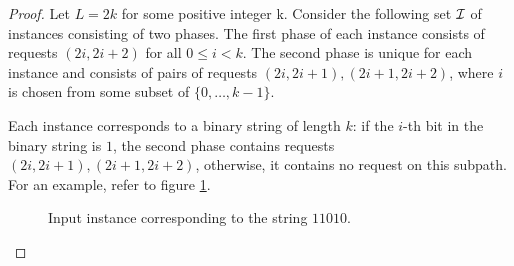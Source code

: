 \begin{proof}
    Let $L = 2k$ for some positive integer k. Consider the following set
    $\mathcal{I}$ of instances consisting of two phases. The first phase of each
    instance consists of requests $(2i, 2i+2)$ for all $0 \leq i < k$.
    The second phase is unique for each instance and consists of pairs of
    requests $(2i, 2i+1), (2i+1, 2i+2)$, where $i$ is chosen from some
    subset of $\{0, \dots, k-1\}$.

    Each instance corresponds to a binary string of length $k$: if the
    $i$-th bit in the binary string is $1$, the second phase contains
    requests $(2i, 2i+1), (2i+1, 2i+2)$, otherwise, it contains no request
    on this subpath. For an example, refer to figure
    \ref{fig:lower-bound-instance}.

    \begin{figure}\centering
        \label{fig:lower-bound-instance}
        \caption{Input instance corresponding to the string $11010$.}
    \end{figure}


\end{proof}
